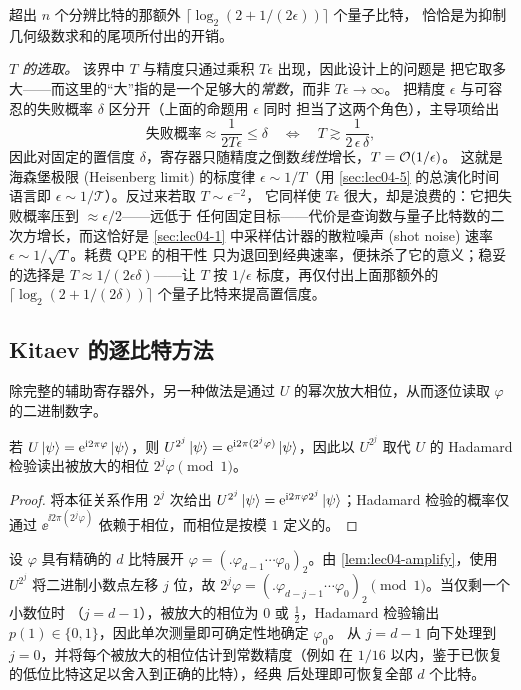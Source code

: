 超出 $n$ 个分辨比特的那额外 $\lceil\log_2(2+1/(2\epsilon))\rceil$ 个量子比特，
恰恰是为抑制几何级数求和的尾项所付出的开销。

\emph{$T$ 的选取。} 该界中 $T$ 与精度只通过乘积 $T\epsilon$ 出现，因此设计上的问题是
把它取多大——而这里的“大”指的是一个足够大的\emph{常数}，而非 $T\epsilon\to\infty$。
把精度 $\epsilon$ 与可容忍的失败概率 $\delta$ 区分开（上面的命题用 $\epsilon$ 同时
担当了这两个角色），主导项给出
\[
  \text{失败概率}\approx\frac{1}{2T\epsilon}\le\delta
  \quad\Longleftrightarrow\quad
  T\gtrsim\frac{1}{2\,\epsilon\,\delta},
\]
因此对固定的置信度 $\delta$，寄存器只随精度之倒数\emph{线性}增长，$T=\mathcal{O}(1/\epsilon)$。
这就是海森堡极限 (Heisenberg limit) 的标度律 $\epsilon\sim1/T$（用 \cref{sec:lec04-5}
的总演化时间语言即 $\epsilon\sim1/\mathcal{T}$）。反过来若取 $T\sim\epsilon^{-2}$，
它同样使 $T\epsilon$ 很大，却是浪费的：它把失败概率压到 $\approx\epsilon/2$——远低于
任何固定目标——代价是查询数与量子比特数的二次方增长，而这恰好是 \cref{sec:lec04-1}
中采样估计器的散粒噪声 (shot noise) 速率 $\epsilon\sim1/\sqrt{T}$。耗费 QPE 的相干性
只为退回到经典速率，便抹杀了它的意义；稳妥的选择是 $T\approx1/(2\epsilon\delta)$——让
$T$ 按 $1/\epsilon$ 标度，再仅付出上面那额外的 $\lceil\log_2(2+1/(2\delta))\rceil$
个量子比特来提高置信度。

\subsection*{Kitaev 的逐比特方法}

除完整的辅助寄存器外，另一种做法是通过 $U$ 的幂次放大相位，从而逐位读取 $\varphi$
的二进制数字。

\begin{lemma}[相位放大]
\label{lem:lec04-amplify}
若 $U\ket{\psi}=\mathrm{e}^{\mathrm{i} 2\pi\varphi}\ket{\psi}$，则
$U^{2^{j}}\ket{\psi}=\mathrm{e}^{\mathrm{i} 2\pi(2^{j}\varphi)}\ket{\psi}$，因此以 $U^{2^{j}}$
取代 $U$ 的 Hadamard 检验读出被放大的相位 $2^{j}\varphi\pmod1$。
\end{lemma}

\begin{proof}
将本征关系作用 $2^{j}$ 次给出 $U^{2^{j}}\ket{\psi}
=\mathrm{e}^{\mathrm{i} 2\pi\varphi 2^{j}}\ket{\psi}$；Hadamard 检验的概率仅通过
$\ee^{\ii 2\pi(2^{j}\varphi)}$ 依赖于相位，而相位是按模 $1$ 定义的。
\end{proof}

设 $\varphi$ 具有精确的 $d$ 比特展开
$\varphi=(.\varphi_{d-1}\cdots\varphi_0)_2$。由 \cref{lem:lec04-amplify}，使用
$U^{2^{j}}$ 将二进制小数点左移 $j$ 位，故 $2^{j}\varphi
=(.\varphi_{d-j-1}\cdots\varphi_0)_2\pmod1$。当仅剩一个小数位时
（$j=d-1$），被放大的相位为 $0$ 或 $\tfrac12$，Hadamard 检验输出
$p(1)\in\{0,1\}$，因此单次测量即可确定性地确定 $\varphi_0$。
从 $j=d-1$ 向下处理到 $j=0$，并将每个被放大的相位估计到常数精度（例如
在 $1/16$ 以内，鉴于已恢复的低位比特这足以舍入到正确的比特），经典
后处理即可恢复全部 $d$ 个比特。

